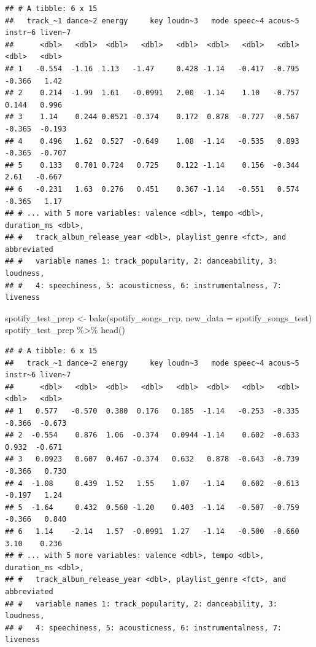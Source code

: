 \documentclass[
]{article}
\newenvironment{Shaded}{\begin{snugshade}}{\end{snugshade}}
\newcommand{\AttributeTok}[1]{\textcolor[rgb]{0.77,0.63,0.00}{#1}}
\newcommand{\FunctionTok}[1]{\textcolor[rgb]{0.00,0.00,0.00}{#1}}
\newcommand{\NormalTok}[1]{#1}
\newcommand{\OtherTok}[1]{\textcolor[rgb]{0.56,0.35,0.01}{#1}}
\newcommand{\SpecialCharTok}[1]{\textcolor[rgb]{0.00,0.00,0.00}{#1}}
\begin{document}
\begin{verbatim}
## # A tibble: 6 x 15
##   track_~1 dance~2 energy     key loudn~3   mode speec~4 acous~5 instr~6 liven~7
##      <dbl>   <dbl>  <dbl>   <dbl>   <dbl>  <dbl>   <dbl>   <dbl>   <dbl>   <dbl>
## 1   -0.554  -1.16  1.13   -1.47     0.428 -1.14   -0.417  -0.795  -0.366   1.42 
## 2    0.214  -1.99  1.61   -0.0991   2.00  -1.14    1.10   -0.757   0.144   0.996
## 3    1.14    0.244 0.0521 -0.374    0.172  0.878  -0.727  -0.567  -0.365  -0.193
## 4    0.496   1.62  0.527  -0.649    1.08  -1.14   -0.535   0.893  -0.365  -0.707
## 5    0.133   0.701 0.724   0.725    0.122 -1.14    0.156  -0.344   2.61   -0.667
## 6   -0.231   1.63  0.276   0.451    0.367 -1.14   -0.551   0.574  -0.365   1.17 
## # ... with 5 more variables: valence <dbl>, tempo <dbl>, duration_ms <dbl>,
## #   track_album_release_year <dbl>, playlist_genre <fct>, and abbreviated
## #   variable names 1: track_popularity, 2: danceability, 3: loudness,
## #   4: speechiness, 5: acousticness, 6: instrumentalness, 7: liveness
\end{verbatim}

\begin{Shaded}
\begin{Highlighting}[]
\NormalTok{spotify\_test\_prep }\OtherTok{\textless{}{-}} \FunctionTok{bake}\NormalTok{(spotify\_songs\_rcp, }\AttributeTok{new\_data =}\NormalTok{ spotify\_songs\_test)}
\NormalTok{spotify\_test\_prep }\SpecialCharTok{\%\textgreater{}\%} \FunctionTok{head}\NormalTok{()}
\end{Highlighting}
\end{Shaded}

\begin{verbatim}
## # A tibble: 6 x 15
##   track_~1 dance~2 energy     key loudn~3   mode speec~4 acous~5 instr~6 liven~7
##      <dbl>   <dbl>  <dbl>   <dbl>   <dbl>  <dbl>   <dbl>   <dbl>   <dbl>   <dbl>
## 1   0.577   -0.570  0.380  0.176   0.185  -1.14   -0.253  -0.335  -0.366  -0.673
## 2  -0.554    0.876  1.06  -0.374   0.0944 -1.14    0.602  -0.633   0.932  -0.671
## 3   0.0923   0.607  0.467 -0.374   0.632   0.878  -0.643  -0.739  -0.366   0.730
## 4  -1.08     0.439  1.52   1.55    1.07   -1.14    0.602  -0.613  -0.197   1.24 
## 5  -1.64     0.432  0.560 -1.20    0.403  -1.14   -0.507  -0.759  -0.366   0.840
## 6   1.14    -2.14   1.57  -0.0991  1.27   -1.14   -0.500  -0.660   3.10    0.236
## # ... with 5 more variables: valence <dbl>, tempo <dbl>, duration_ms <dbl>,
## #   track_album_release_year <dbl>, playlist_genre <fct>, and abbreviated
## #   variable names 1: track_popularity, 2: danceability, 3: loudness,
## #   4: speechiness, 5: acousticness, 6: instrumentalness, 7: liveness
\end{verbatim}
\end{document}
